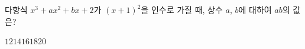 다항식 $x^3+ax^2+bx+2$가 $(x+1)^2$을 인수로 가질 때, 상수 $a$, $b$에 대하여 $ab$의 값은?
\begin{choices32}{$12$}{$14$}{$16$}{$18$}{$20$}\end{choices32}
